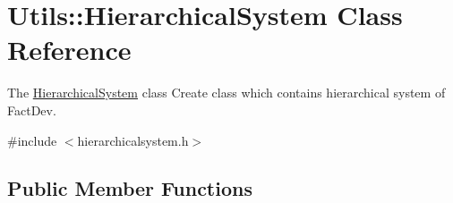\hypertarget{classUtils_1_1HierarchicalSystem}{\section{Utils\-:\-:Hierarchical\-System Class Reference}
\label{classUtils_1_1HierarchicalSystem}
}


The \hyperlink{classUtils_1_1HierarchicalSystem}{Hierarchical\-System} class Create class which contains hierarchical system of Fact\-Dev.  




{\ttfamily \#include $<$hierarchicalsystem.\-h$>$}

\subsection*{Public Member Functions}
